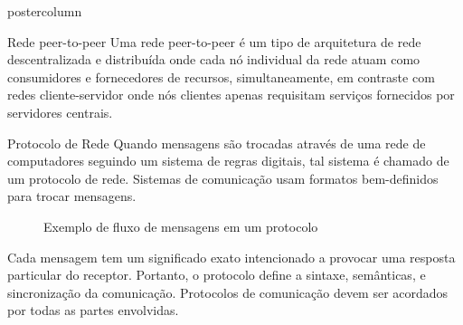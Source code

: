 \documentclass[final]{beamer}
\begin{document}
\begin{frame}
\begin{columns}
\begin{column}{.5\textwidth}
\begin{beamercolorbox}[center,wd=\textwidth]{postercolumn}
\begin{minipage}[T]{.95\textwidth}
{\begin{block}{Rede peer-to-peer}
                Uma rede peer-to-peer é um tipo de arquitetura de rede descentralizada e distribuída
                onde cada nó individual da rede atuam como consumidores e fornecedores de recursos,
                simultaneamente, em contraste com redes cliente-servidor onde nós clientes apenas
                requisitam serviços fornecidos por servidores centrais.
                
                \vspace*{0.2cm}
            \end{block}
            
            \vspace*{0.2cm}

            \begin{block}{Protocolo de Rede}
            \justifying
                Quando mensagens são trocadas através de uma rede de computadores seguindo um sistema de regras digitais,
                tal sistema é chamado de um protocolo de rede. Sistemas de comunicação usam formatos bem-definidos para
                trocar mensagens. 
                
                \vspace*{0.4cm} 
                
                \begin{figure}[h]
                  \caption{Exemplo de fluxo de mensagens em um protocolo}
                \end{figure}
                
                \vspace*{0.2cm} 
                
                Cada mensagem tem um significado exato intencionado a provocar uma resposta particular
                do receptor. Portanto, o protocolo define a sintaxe, semânticas, e sincronização da comunicação. Protocolos
                de comunicação devem ser acordados por todas as partes envolvidas.
                               

\end{block}}
\end{minipage}
\end{beamercolorbox}
\end{column}
\end{columns}
\end{frame}
\end{document}
